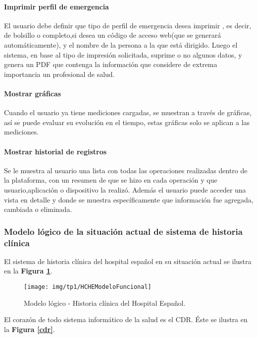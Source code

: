 \paragraph{Imprimir perfil de emergencia}

El usuario debe definir que tipo de perfil de emergencia desea imprimir , es decir, de bolsillo o completo,si desea un código de acceso web(que se generará automáticamente), y el nombre de la persona a la que está dirigido. Luego el sistema, en base al tipo de impresión solicitada, suprime o no algunos datos, y genera un PDF que contenga la información que considere de extrema importancia un profesional de salud.

\paragraph{Mostrar gráficas}

Cuando el usuario ya tiene mediciones cargadas, se muestran a través de gráficas, así se puede evaluar su evolución en el tiempo, estas gráficas solo se aplican a las mediciones.

\paragraph{Mostrar historial de registros}

Se le muestra al usuario una lista con todas las operaciones realizadas dentro de la plataforma, con un resumen de que se hizo en cada operación y que usuario,aplicación o dispositivo la realizó. Además el usuario puede acceder una vista en detalle y donde se muestra específicamente que información fue agregada, cambiada o eliminada.


\subsubsection{Modelo lógico de la situación actual de sistema de historia clínica}
El sistema de historia clínica del hospital español en su situación actual se ilustra en la \textbf{Figura \ref{mlogicoHCE}}.


\begin{figure}
  \centering
  \texttt{[image: img/tp1/HCHEModeloFuncional]}
  \caption{Modelo lógico - Historia clínica del Hospital Español.}
  \label{mlogicoHCE}
\end{figure}


El corazón de todo sistema informático de la salud es el CDR. Éste se ilustra en la \textbf{Figura \ref{cdr}}.

